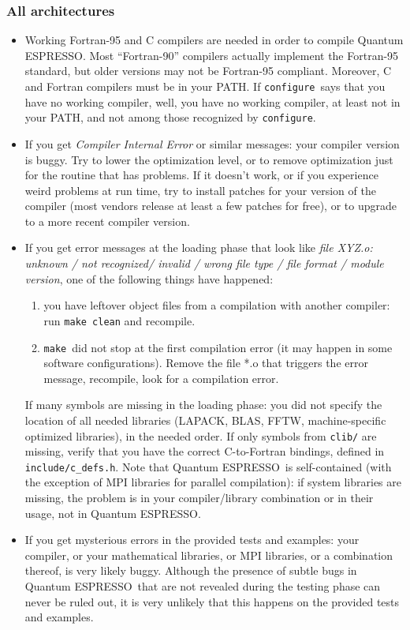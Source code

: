 \documentclass[12pt,a4paper]{article}
\def\qe{{\sc Quantum ESPRESSO}}
\def\configure{\texttt{configure}}
\def\make{\texttt{make}}
\begin{document}
\subsubsection{All architectures}
\begin{itemize}
\item
Working Fortran-95 and C compilers are needed in order
to compile \qe. Most ``Fortran-90'' compilers actually
implement the Fortran-95 standard, but older versions 
may not be Fortran-95 compliant. Moreover, 
C and Fortran compilers must be in your PATH.
If \configure\ says that you have no working compiler, well,
you have no working compiler, at least not in your PATH, and
not among those recognized by \configure.
\item
If you get {\em Compiler Internal Error} or similar messages: your
compiler version is buggy. Try to lower the optimization level, or to
remove optimization just for the routine that has problems. If it
doesn't work, or if you experience weird problems at run time, try to 
install patches for your version of the compiler (most vendors release
at least a few patches for free), or to upgrade to a more recent
compiler version.
\item
If you get error messages at the loading phase that look like 
{\em file XYZ.o: unknown / not recognized/ invalid / wrong
file type / file format / module version},
one of the following things have happened:
\begin{enumerate}
\item you have leftover object files from a compilation with another
  compiler: run \texttt{make clean} and recompile. 
\item \make\ did not stop at the first compilation error (it may 
happen in some software configurations). Remove the file *.o
that triggers the error message, recompile, look for a 
compilation error. 
\end{enumerate}
If many symbols are missing in the loading phase: you did not specify the
location of all needed libraries (LAPACK, BLAS, FFTW, machine-specific
optimized libraries), in the needed order. 
If only symbols from \texttt{clib/} are missing, verify that
you have the correct C-to-Fortran bindings, defined in 
\texttt{include/c\_defs.h}.
Note that \qe\ is self-contained (with the exception of MPI libraries for 
parallel compilation): if system libraries are missing, the problem is in
your compiler/library combination or in their usage, not in \qe.
\item
If you get mysterious errors in the provided tests and examples:
your compiler, or your mathematical libraries, or MPI libraries,
or a combination thereof, is very likely buggy. Although the 
presence of subtle bugs in \qe\ that are not revealed during 
the testing phase can never be ruled out, it is very unlikely
that this happens on the provided tests and examples. 
\end{itemize}
\end{document}
